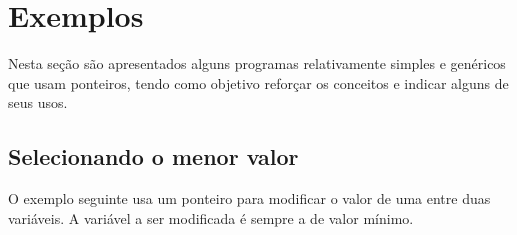 \documentclass[
  11pt,
  a4paper,
]{scrbook}
\begin{document}
\section{Exemplos}\label{exemplos-3}

Nesta seção são apresentados alguns programas relativamente simples e
genéricos que usam ponteiros, tendo como objetivo reforçar os conceitos
e indicar alguns de seus usos.

\subsection{Selecionando o menor
valor}\label{selecionando-o-menor-valor}

O exemplo seguinte usa um ponteiro para modificar o valor de uma entre
duas variáveis. A variável a ser modificada é sempre a de valor mínimo.
\end{document}
